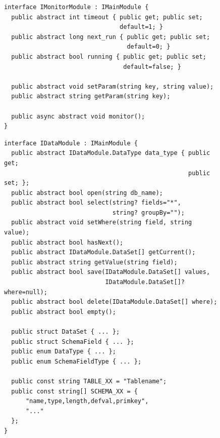 \begin{figure}[H]
 \lstset{language=[ISO]C++}
 \begin{lstlisting}[label=alg:praxis-basis-imonitormodule,caption={[Interface: IMonitorModule]Das Interface eines \"Uberwachungsmoduls besteht haupts\"achlich aus der Methode \texttt{monitor()}, welche asynchron definiert ist, um nicht auf eine R\"uckmeldung warten zu m\"ussen. Die Properties \texttt{timeout}, \texttt{next\_run} und \texttt{running} dienen zur Pr\"ufung, ob ein Modul aktuell eine Pr\"ufung durchf\"uhrt oder nicht, sowie um den Zeitpunkt der n\"achsten Pr\"ufung zu berechnen.}]
interface IMonitorModule : IMainModule {
  public abstract int timeout { public get; public set;
                                default=1; }
  public abstract long next_run { public get; public set;
                                  default=0; }
  public abstract bool running { public get; public set;
                                 default=false; }

  public abstract void setParam(string key, string value);
  public abstract string getParam(string key);

  public async abstract void monitor();
}
 \end{lstlisting}
\end{figure}

\begin{figure}[H]
 \lstset{language=[ISO]C++}
 \begin{lstlisting}[label=alg:praxis-basis-idatamodule,caption={[Interface: IDataModule]Das Interface eines Datenmodules beinhaltet Methoden zum Auslesen wie auch zum Schreiben von Daten. Zus\"atzlich sind noch verschiedene Datentypen, Konstanten und Strukturen definiert, welche bei der Initialisierung und der Datenbehandlung gebraucht werden. Die zus\"atzlichen Konstanten, Strukturen und Datentypen werden hier nur exemplarisch dargestellt.}]
interface IDataModule : IMainModule {
  public abstract IDataModule.DataType data_type { public get;
                                                   public set; };
  public abstract bool open(string db_name);
  public abstract bool select(string? fields="*",
                              string? groupBy="");
  public abstract void setWhere(string field, string value);
  public abstract bool hasNext();
  public abstract IDataModule.DataSet[] getCurrent();
  public abstract string getValue(string field);
  public abstract bool save(IDataModule.DataSet[] values,
                            IDataModule.DataSet[]? where=null);
  public abstract bool delete(IDataModule.DataSet[] where);
  public abstract bool empty();

  public struct DataSet { ... };
  public struct SchemaField { ... };
  public enum DataType { ... };
  public enum SchemaFieldType { ... };

  public const string TABLE_XX = "Tablename";
  public const string[] SCHEMA_XX = {
      "name,type,length,defval,primkey",
      "..."
  };
}
 \end{lstlisting}
\end{figure}

